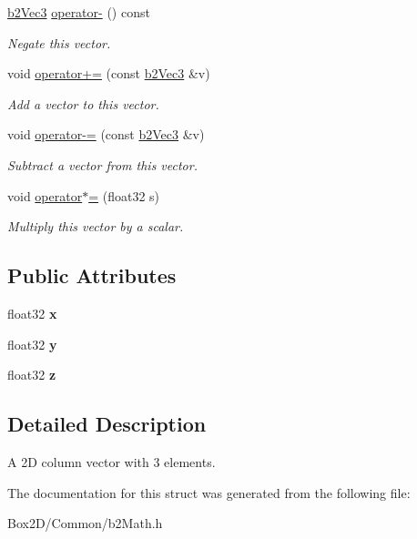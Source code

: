 \begin{DoxyCompactItemize}
\mbox{\label{structb2_vec3_a396e2b5b3c53a502859ff80544c27db8}} 
\hyperlink{structb2_vec3}{b2\+Vec3} \hyperlink{structb2_vec3_a396e2b5b3c53a502859ff80544c27db8}{operator-\/} () const
\begin{DoxyCompactList}\small\item\em Negate this vector. \end{DoxyCompactList}\item 
\mbox{\label{structb2_vec3_a2aaeed3f5308aad85d19c5f0efc72641}} 
void \hyperlink{structb2_vec3_a2aaeed3f5308aad85d19c5f0efc72641}{operator+=} (const \hyperlink{structb2_vec3}{b2\+Vec3} \&v)
\begin{DoxyCompactList}\small\item\em Add a vector to this vector. \end{DoxyCompactList}\item 
\mbox{\label{structb2_vec3_a9e5b535548e1c5dfc0dc258d08f5ca32}} 
void \hyperlink{structb2_vec3_a9e5b535548e1c5dfc0dc258d08f5ca32}{operator-\/=} (const \hyperlink{structb2_vec3}{b2\+Vec3} \&v)
\begin{DoxyCompactList}\small\item\em Subtract a vector from this vector. \end{DoxyCompactList}\item 
\mbox{\label{structb2_vec3_aaa9aa20195cd0ee53c7176a9a9b02389}} 
void \hyperlink{structb2_vec3_aaa9aa20195cd0ee53c7176a9a9b02389}{operator$\ast$=} (float32 s)
\begin{DoxyCompactList}\small\item\em Multiply this vector by a scalar. \end{DoxyCompactList}\end{DoxyCompactItemize}
\subsection*{Public Attributes}
\begin{DoxyCompactItemize}
\item 
\mbox{\label{structb2_vec3_aedc5e37849caa413a8e767fc47741db2}} 
float32 {\bfseries x}
\item 
\mbox{\label{structb2_vec3_af5a7e99d13d02ff9abb323838d44d3b1}} 
float32 {\bfseries y}
\item 
\mbox{\label{structb2_vec3_a7cb88968ff10fa500df0b10f5c425536}} 
float32 {\bfseries z}
\end{DoxyCompactItemize}


\subsection{Detailed Description}
A 2D column vector with 3 elements. 

The documentation for this struct was generated from the following file\+:\begin{DoxyCompactItemize}
\item 
Box2\+D/\+Common/b2\+Math.\+h\end{DoxyCompactItemize}
